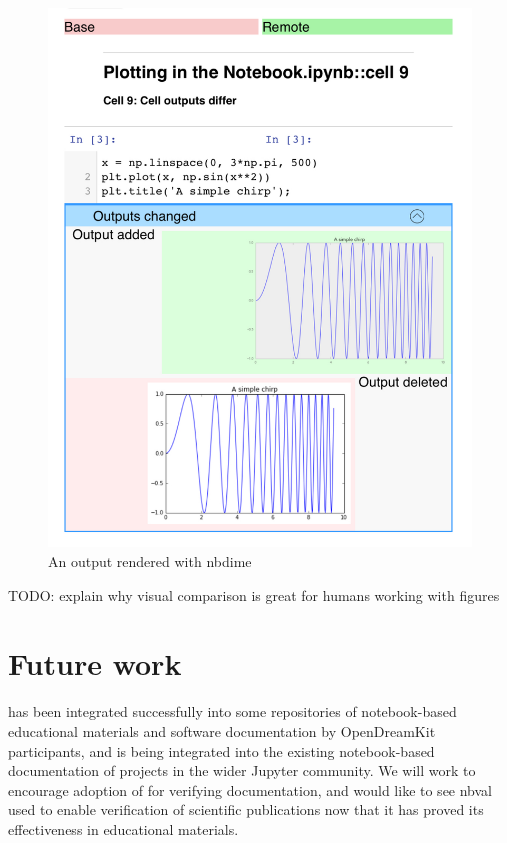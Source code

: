 \documentclass{deliverablereport}
\begin{document}
\begin{figure}[ht]
  \centering
  \includegraphics[width=.7\textwidth]{img/nbval-nbdime}
  \caption{An \nbval output rendered with nbdime}\label{fig:nbval-nbdime}
\end{figure}

TODO: explain why visual comparison is great for humans working with figures

\section{Future work} %

\nbval has been integrated successfully into some repositories of
notebook-based educational materials and software documentation by
OpenDreamKit participants, and is being integrated into the existing
notebook-based documentation of projects in the wider Jupyter
community.  We will work to encourage adoption of \nbval for verifying
documentation, and would like to see nbval used to enable verification
of scientific publications now that it has proved its effectiveness in
educational materials.

\printbibliography
\end{document}
